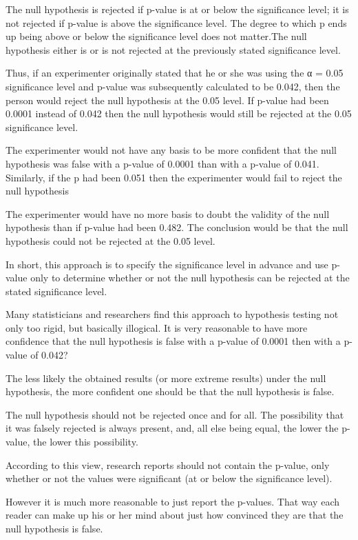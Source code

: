 \documentclass[a4paper,12pt]{article}
\begin{document}
The null hypothesis is rejected if p-value is at or below the significance level; it is not rejected if p-value is above the significance level. The degree to which p ends up being above or below the significance level does not matter.The null hypothesis either is or is not rejected at the previously stated significance level.

Thus, if an experimenter originally stated that he or she was using the α = 0.05 significance level and p-value was subsequently calculated to be 0.042, then the person would reject the null hypothesis at the 0.05 level. If p-value had been 0.0001 instead of 0.042 then the null hypothesis would still be rejected at the 0.05 significance level.

The experimenter would not have any basis to be more confident that the null hypothesis was false with a p-value of 0.0001 than with a p-value of 0.041. Similarly, if the p had been 0.051 then the experimenter would fail to reject the null hypothesis

The experimenter would have no more basis to doubt the validity of the null hypothesis than if p-value had been 0.482. The conclusion would be that the null hypothesis could not be rejected at the 0.05 level.

In short, this approach is to specify the significance level in advance and use p-value only to determine whether or not the null hypothesis can be rejected at the stated significance level.

Many statisticians and researchers find this approach to hypothesis testing not only too rigid, but basically illogical. It is very reasonable to  have more confidence that the null hypothesis is false with a p-value of 0.0001 then with a p-value of 0.042?

The less likely the obtained results (or more extreme results) under the null hypothesis, the more confident one should be that the null hypothesis is false.

The null hypothesis should not be rejected once and for all. The possibility that it was falsely rejected is always present, and, all else being equal, the lower the p-value, the lower this possibility.

According to this view, research reports should not contain the p-value, only whether or not the values were significant (at or below the significance level).

However it is much more reasonable to just report the p-values. That way each reader can make up his or her mind about just how convinced they are that the null hypothesis is false.
\end{document}
